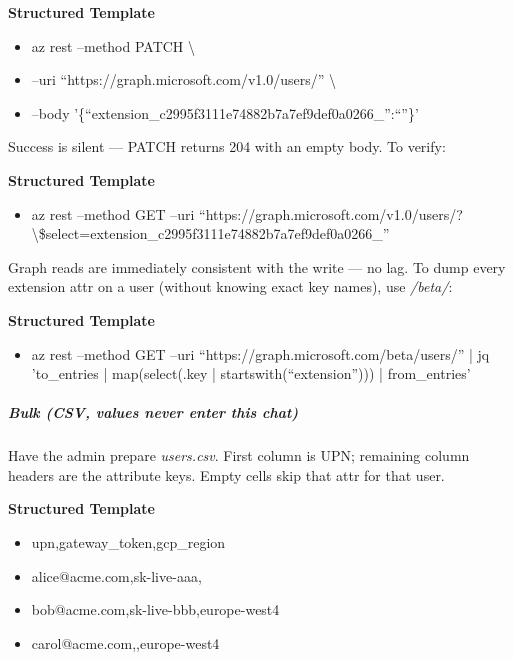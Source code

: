 \documentclass[11pt]{article}
\begin{document}
\textbf{Structured Template}
\begin{itemize}[leftmargin=*,itemsep=2pt,topsep=2pt]
\item {} az rest --method PATCH \textbackslash{}
\item {} --uri ``https://graph.microsoft.com/v1.0/users/'' \textbackslash{}
\item {} --body '\{``extension\_\allowbreak{}c2995f3111e74882b7a7ef9def0a0266\_\allowbreak{}'':``''\}'
\end{itemize}

Success is silent — PATCH returns 204 with an empty body. To verify:


\textbf{Structured Template}
\begin{itemize}[leftmargin=*,itemsep=2pt,topsep=2pt]
\item {} az rest --method GET --uri ``https://graph.microsoft.com/v1.0/users/?\textbackslash{}\$select=extension\_\allowbreak{}c2995f3111e74882b7a7ef9def0a0266\_\allowbreak{}''
\end{itemize}

Graph reads are immediately consistent with the write — no lag. To dump every extension attr on a user (without knowing exact key names), use \emph{/beta/}:


\textbf{Structured Template}
\begin{itemize}[leftmargin=*,itemsep=2pt,topsep=2pt]
\item {} az rest --method GET --uri ``https://graph.microsoft.com/beta/users/'' | jq 'to\_\allowbreak{}entries | map(select(.key | startswith(``extension''))) | from\_\allowbreak{}entries'
\end{itemize}

\subparagraph{Bulk (CSV, values never enter this chat)}\mbox{}\par

Have the admin prepare \emph{users.csv}. First column is UPN; remaining column headers are the attribute keys. Empty cells skip that attr for that user.


\textbf{Structured Template}
\begin{itemize}[leftmargin=*,itemsep=2pt,topsep=2pt]
\item {} upn,gateway\_\allowbreak{}token,gcp\_\allowbreak{}region
\item {} alice@acme.com,sk-live-aaa,
\item {} bob@acme.com,sk-live-bbb,europe-west4
\item {} carol@acme.com,,europe-west4
\end{itemize}
\end{document}
